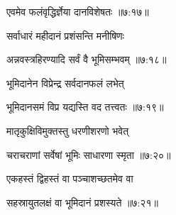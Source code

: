 
{\devanagarifont एवमेव फलंवृद्धिर्ज्ञेया दानविशेषतः {॥७:१७॥} \veg\dontdisplaylinenum }%



{\devanagarifont सर्वाधारं महीदानं प्रशंसन्ति मनीषिणः \thinspace{\dandab} \dontdisplaylinenum }%


{\devanagarifont अन्नवस्त्रहिरण्यादि सर्वं वै भूमिसम्भवम् {॥७:१८॥} \veg\dontdisplaylinenum }%

{\devanagarifont भूमिदानेन विप्रेन्द्र सर्वदानफलं लभेत् \thinspace{\dandab} \dontdisplaylinenum }%


{\devanagarifont भूमिदानसमं विप्र यद्यस्ति वद तत्त्वतः {॥७:१९॥} \veg\dontdisplaylinenum }%
 
{\devanagarifont मातृकुक्षिविमुक्तस्तु धरणीशरणो भवेत् \thinspace{\dandab} \dontdisplaylinenum }%


{\devanagarifont चराचराणां सर्वेषां भूमिः साधारणा स्मृता {॥७:२०॥} \veg\dontdisplaylinenum }%
 
{\devanagarifont एकहस्तं द्विहस्तं वा पञ्चाशच्छतमेव वा \thinspace{\dandab} \dontdisplaylinenum }%


{\devanagarifont सहस्रायुतलक्षं वा भूमिदानं प्रशस्यते {॥७:२१॥} \veg\dontdisplaylinenum }%

